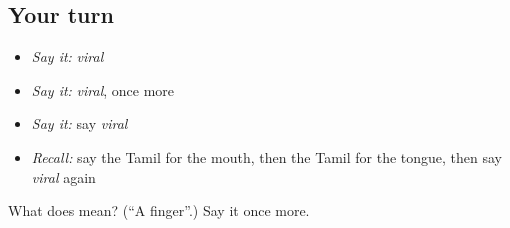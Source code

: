 \subsection*{Your turn}
\begin{itemize}
\raggedright
  \item \emph{Say it:} \emph{viral}
  \item \emph{Say it:} \emph{viral}, once more
  \item \emph{Say it:} say \emph{viral}
  \item \emph{Recall:} say the Tamil for the mouth, then the Tamil for the tongue, then say \emph{viral} again
\end{itemize}

\begin{tcolorbox}[breakable,colback=teal!4,colframe=teal!35!black,title={Before you move on}]
What does  mean? (\textquotedblleft{}A finger\textquotedblright{}.) Say it once more.
\end{tcolorbox}
